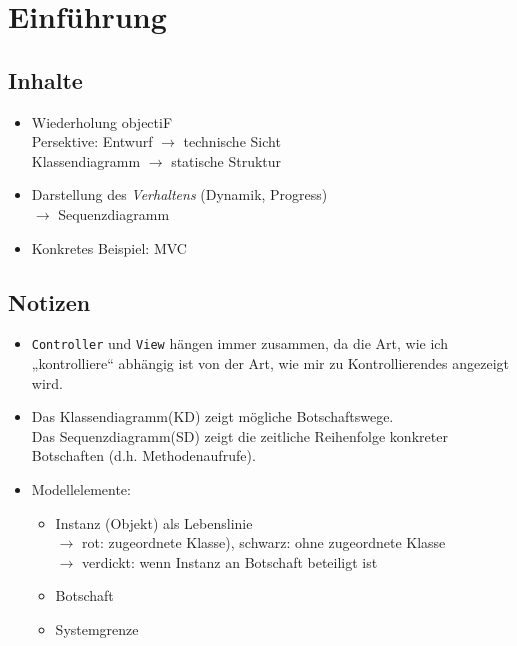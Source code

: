 \chapter{Einführung}
\section*{Inhalte}
\begin{itemize}
\item Wiederholung objectiF\\
Persektive: Entwurf $\to$ technische Sicht\\
Klassendiagramm $\to$ statische Struktur
\item Darstellung des \emph{Verhaltens} (Dynamik, Progress)\\
$\to$ Sequenzdiagramm
\item Konkretes Beispiel: MVC
\end{itemize}
\section*{Notizen}
\begin{itemize}
\item \lstinline$Controller$ und \lstinline$View$ hängen immer zusammen, da die Art, wie ich „kontrolliere“ abhängig ist von der Art, wie mir zu Kontrollierendes angezeigt wird.
\item Das Klassendiagramm(KD) zeigt mögliche Botschaftswege.\\
Das Sequenzdiagramm(SD) zeigt die zeitliche Reihenfolge konkreter Botschaften (d.h. Methodenaufrufe).
\item Modellelemente:
\begin{itemize}
\item Instanz (Objekt) als Lebenslinie\\
$\to$ rot: zugeordnete Klasse), schwarz: ohne zugeordnete Klasse\\
$\to$ verdickt: wenn Instanz an Botschaft beteiligt ist
\item Botschaft
\item Systemgrenze
\end{itemize}
\end{itemize}

